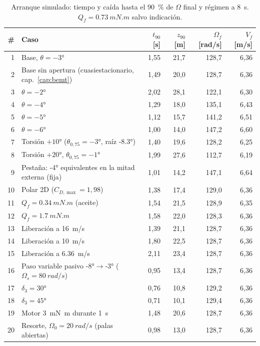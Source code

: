 \begin{table}[H]
\centering
\small
\caption{Arranque simulado: tiempo y caída hasta el \SI{90}{\percent} de $\Omega$ final y
régimen a \SI{8}{s}. $Q_f=\SI{0.73}{mN.m}$ salvo indicación.}
\label{tab:arranque-casos}
\begin{tabular}{rlrrrr}
\toprule
\# & Caso & $t_{90}$ [s] & $z_{90}$ [m] & $\Omega_f$ [rad/s] & $V_f$ [m/s] \\
\midrule
1 & Base, $\theta=\ang{-3}$ & 1,55 & 21,7 & 128,7 & 6,36 \\
2 & Base sin apertura (cuasiestacionario, cap.~\ref{cap:bemt}) & 1,49 & 20,0 & 128,7 & 6,36 \\
3 & $\theta=\ang{-2}$ & 2,02 & 28,1 & 122,1 & 6,30 \\
4 & $\theta=\ang{-4}$ & 1,29 & 18,0 & 135,1 & 6,43 \\
5 & $\theta=\ang{-5}$ & 1,12 & 15,7 & 141,2 & 6,51 \\
6 & $\theta=\ang{-6}$ & 1,00 & 14,0 & 147,2 & 6,60 \\
7 & Torsión $+\ang{10}$ ($\theta_{0,75}=\ang{-3}$, raíz \ang{-8.3}) & 1,40 & 19,6 & 128,2 & 6,25 \\
8 & Torsión $+\ang{20}$, $\theta_{0,75}=\ang{-1}$ & 1,99 & 27,6 & 112,7 & 6,19 \\
9 & Pestaña: \ang{-4} equivalentes en la mitad externa (fija) & 1,01 & 14,2 & 147,1 & 6,64 \\
10 & Polar 2D ($C_{D,\max}=1{,}98$) & 1,38 & 17,4 & 129,0 & 6,36 \\
11 & $Q_f=\SI{0.34}{mN.m}$ (aceite) & 1,54 & 21,5 & 128,9 & 6,35 \\
12 & $Q_f=\SI{1.7}{mN.m}$ & 1,58 & 22,0 & 128,3 & 6,36 \\
13 & Liberación a \SI{16}{m/s} & 1,39 & 21,1 & 128,7 & 6,36 \\
14 & Liberación a \SI{10}{m/s} & 1,80 & 22,5 & 128,7 & 6,36 \\
15 & Liberación a \SI{6.36}{m/s} & 2,11 & 23,4 & 128,7 & 6,36 \\
16 & Paso variable pasivo \ang{-8}$\to$\ang{-3} ($\Omega_s=\SI{80}{rad/s}$) & 0,95 & 13,4 & 128,7 & 6,36 \\
17 & $\delta_3=\ang{30}$ & 0,76 & 10,8 & 129,2 & 6,36 \\
18 & $\delta_3=\ang{45}$ & 0,71 & 10,1 & 129,4 & 6,36 \\
19 & Motor \SI{3}{mN.m} durante \SI{1}{s} & 1,48 & 20,6 & 128,7 & 6,36 \\
20 & Resorte, $\Omega_0=\SI{20}{rad/s}$ (palas abiertas) & 0,98 & 13,0 & 128,7 & 6,36 \\

\end{tabular}
\end{table}
